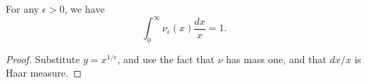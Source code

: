 \begin{lemma}[DeltaSpikeMass]
\label{DeltaSpikeMass}
\leanok
For any $\epsilon>0$, we have
  $$\int_0^\infty \nu_\epsilon(x)\frac{dx}{x} = 1.$$
\end{lemma}
\begin{proof}
\leanok
Substitute $y=x^{1/\epsilon}$, and use the fact that $\nu$ has mass one, and that $dx/x$ is Haar
  measure.
\end{proof}
